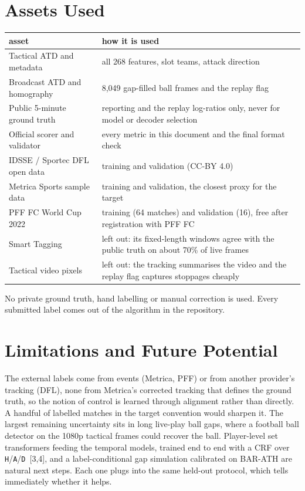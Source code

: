 \documentclass[10pt]{article}
\begin{document}
\section*{Assets Used}
\begin{table}[H]
\centering\small
\begin{tabularx}{\linewidth}{@{}l X@{}}
\toprule
asset & how it is used \\
\midrule
Tactical ATD and metadata & all 268 features, slot teams, attack direction \\
Broadcast ATD and homography & 8{,}049 gap-filled ball frames and the replay flag \\
Public 5-minute ground truth & reporting and the replay log-ratios only, never for model or decoder selection \\
Official scorer and validator & every metric in this document and the final format check \\
IDSSE / Sportec DFL open data & training and validation (CC-BY 4.0) \\
Metrica Sports sample data & training and validation, the closest proxy for the target \\
PFF FC World Cup 2022 & training (64 matches) and validation (16), free after registration with PFF FC \\
\midrule
Smart Tagging & left out: its fixed-length windows agree with the public truth on about 70\% of live frames \\
Tactical video pixels & left out: the tracking summarises the video and the replay flag captures stoppages cheaply \\
\bottomrule
\end{tabularx}
\end{table}
No private ground truth, hand labelling or manual correction is used. Every submitted label comes out of the algorithm in the repository.

\section*{Limitations and Future Potential}
The external labels come from events (Metrica, PFF) or from another provider's tracking (DFL), none from Metrica's corrected tracking that defines the ground truth, so the notion of control is learned through alignment rather than directly. A handful of labelled matches in the target convention would sharpen it. The largest remaining uncertainty sits in long live-play ball gaps, where a football ball detector on the 1080p tactical frames could recover the ball. Player-level set transformers feeding the temporal models, trained end to end with a CRF over \texttt{H}/\texttt{A}/\texttt{D}~[3,4], and a label-conditional gap simulation calibrated on BAR-ATH are natural next steps. Each one plugs into the same held-out protocol, which tells immediately whether it helps.
\end{document}
